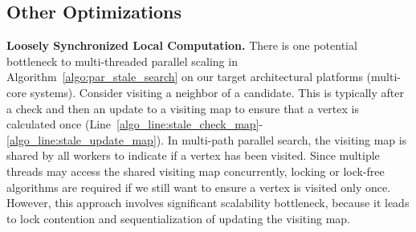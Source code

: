 %

\subsection{Other Optimizations}

\noindent\textbf{Loosely Synchronized Local Computation.}
There is one potential bottleneck to multi-threaded parallel scaling in Algorithm~\ref{algo:par_stale_search} on our target architectural platforms (multi-core systems). 
Consider visiting a neighbor of a candidate. This is typically after a check and then an update to a visiting map to ensure that a vertex is calculated once (Line~\ref{algo_line:stale_check_map}-\ref{algo_line:stale_update_map}).
In multi-path parallel search, the visiting map is shared by all workers to indicate if a vertex has been visited.
Since multiple threads may access the shared visiting map concurrently, locking or lock-free algorithms are required if we still want to ensure a vertex is visited only once. However, this approach involves significant scalability bottleneck, because it leads to lock contention and sequentialization of updating the visiting map.

